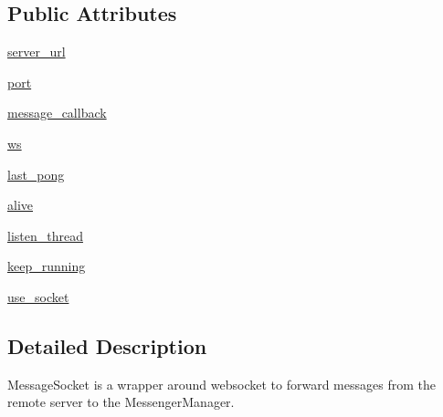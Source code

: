 \subsection*{Public Attributes}
\begin{DoxyCompactItemize}
\item 
\hyperlink{classparlai_1_1chat__service_1_1services_1_1messenger_1_1message__socket_1_1MessageSocket_af20fb3369fc09726dd136f7bcc3dc959}{server\+\_\+url}
\item 
\hyperlink{classparlai_1_1chat__service_1_1services_1_1messenger_1_1message__socket_1_1MessageSocket_ad3796fb1d859ec94a6c7b5669bd8b4a5}{port}
\item 
\hyperlink{classparlai_1_1chat__service_1_1services_1_1messenger_1_1message__socket_1_1MessageSocket_a8466c47481c63f872108b57ef0387c2c}{message\+\_\+callback}
\item 
\hyperlink{classparlai_1_1chat__service_1_1services_1_1messenger_1_1message__socket_1_1MessageSocket_abc5470121d0bc666fd184f9278adb409}{ws}
\item 
\hyperlink{classparlai_1_1chat__service_1_1services_1_1messenger_1_1message__socket_1_1MessageSocket_aa4aaa438af27d700bfb20424210a543f}{last\+\_\+pong}
\item 
\hyperlink{classparlai_1_1chat__service_1_1services_1_1messenger_1_1message__socket_1_1MessageSocket_ac6cb7e773c1c2cbe2cc1bc661bc20fc2}{alive}
\item 
\hyperlink{classparlai_1_1chat__service_1_1services_1_1messenger_1_1message__socket_1_1MessageSocket_a701d0f5997a421ce3c5fd2f66802cc9c}{listen\+\_\+thread}
\item 
\hyperlink{classparlai_1_1chat__service_1_1services_1_1messenger_1_1message__socket_1_1MessageSocket_a94e997d977745b45d2252b7a48009897}{keep\+\_\+running}
\item 
\hyperlink{classparlai_1_1chat__service_1_1services_1_1messenger_1_1message__socket_1_1MessageSocket_ac3adc2616fd34a9fc7d0718035db60fa}{use\+\_\+socket}
\end{DoxyCompactItemize}


\subsection{Detailed Description}
\begin{DoxyVerb}MessageSocket is a wrapper around websocket to forward messages from the remote
server to the MessengerManager.
\end{DoxyVerb}
 


